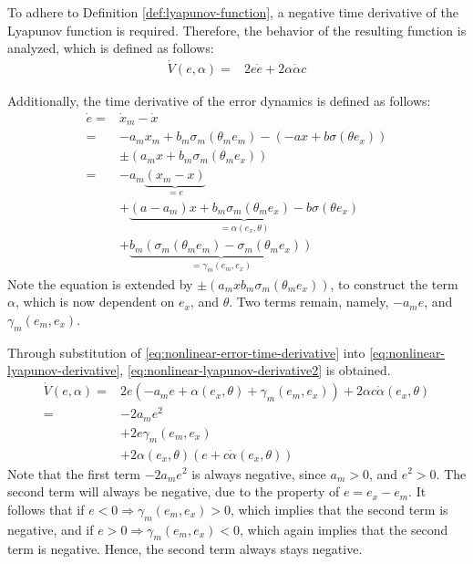 To adhere to Definition \ref{def:lyapunov-function}, a negative time derivative of the Lyapunov function is required. Therefore, the behavior of the resulting function is analyzed, which is defined as follows:
\begin{equation}
 \begin{aligned}
 \dot V(e, \alpha) = & 2e\dot e + 2\alpha \dot \alpha c
 \end{aligned}
 \label{eq:nonlinear-lyapunov-derivative}
\end{equation}

Additionally, the time derivative of the error dynamics is defined as follows:
\begin{equation}
    \begin{aligned}
    \dot e 
= & \dot x_m - \dot x \\ 
= & -a_mx_m + b_m\sigma_m(\theta_me_m) - (-ax + b\sigma(\theta e_x)) \\
    & \pm (a_mx + b_m \sigma_m(\theta_m e_x)) \\
    = & -a_m \underbrace{(x_m-x)}_{=e} \\ 
    & + \underbrace{(a-a_m)x+b_m\sigma_m(\theta_me_x) - b\sigma(\theta e_x)}_{=\alpha(e_x, \theta)} \\ 
    & + \underbrace{b_m(\sigma_m(\theta_m e_m)-\sigma_m(\theta_m e_x))}_{=\gamma_m(e_m,e_x)}
    \end{aligned}
    \label{eq:nonlinear-error-time-derivative}
\end{equation}
Note the equation is extended by $\pm (a_mx b_m \sigma_m(\theta_m e_x))$, to construct the term $\alpha$, which is now dependent on $e_x$, and $\theta$. Two terms remain, namely, $-a_me$, and $\gamma_m(e_m, e_x)$.


Through substitution of \eqref{eq:nonlinear-error-time-derivative} into \eqref{eq:nonlinear-lyapunov-derivative}, \eqref{eq:nonlinear-lyapunov-derivative2} is obtained.
\begin{equation}
    \begin{aligned}
    \dot V(e, \alpha) 
    = & 2e(-a_me + \alpha(e_x, \theta) + \gamma_m(e_m, e_x)) + 2\alpha c \dot \alpha(e_x, \theta)\\
    = & -2a_me^2 \\ 
    & + 2e\gamma_m(e_m, e_x) 
    \\ 
    & + 2\alpha(e_x, \theta)(e + c \dot \alpha(e_x, \theta))
    \end{aligned}
    \label{eq:nonlinear-lyapunov-derivative2}
\end{equation}
Note that the first term $-2a_me^2$ is always negative, since $a_m>0$, and $e^2 > 0$. The second term will always be negative, due to the property of $e=e_x-e_m$. It follows that if $e<0 \Rightarrow \gamma_m(e_m, e_x)>0$, which implies that the second term is negative, and if $e>0 \Rightarrow \gamma_m(e_m, e_x)<0$, which again implies that the second term is negative. Hence, the second term always stays negative.

